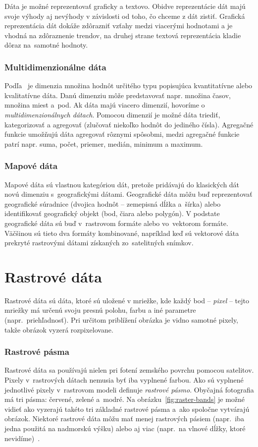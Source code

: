 Dáta je možné reprezentovať graficky a textovo. Obidve reprezentácie dát majú svoje výhody aj nevýhody v závislosti od toho, čo chceme z dát zistiť. Grafická reprezentácia dát dokáže zdôrazniť vzťahy medzi viacerými hodnotami a je vhodná na zdôraznenie trendov, na druhej strane textová reprezentácia kladie dôraz na~samotné hodnoty.

\subsubsection{Multidimenzionálne dáta}
Podľa~\cite{hynek2021webvisual} je dimenzia množina hodnôt určitého typu popisujúca kvantitatívne alebo kvalitatívne dáta. Danú dimenziu môže predstavovať napr. množina časov, množina miest a~pod. Ak dáta majú viacero dimenzií, hovoríme o \emph{multidimenzionálnych dátach}. Pomocou dimenzií je možné dáta triediť, kategorizovať a agregovať (zlučovať niekoľko hodnôt do jediného čísla). Agregačné funkcie umožňujú dáta agregovať rôznymi spôsobmi, medzi agregačné funkcie patrí napr. suma, počet, priemer, medián, minimum a maximum.

\subsubsection{Mapové dáta}
Mapové dáta sú vlastnou kategóriou dát, pretože pridávajú do klasických dát novú dimenziu s~geografickými dátami. Geografické dáta môžu buď reprezentovať geografické súradnice (dvojica hodnôt \--- zemepisná dĺžka a~šírka) alebo identifikovať geografický objekt (bod, čiara alebo polygón). V podstate geografické dáta sú buď v~rastrovom formáte alebo vo~vektorom formáte. Väčšinou sú tieto dva formáty kombinované, napríklad keď sú vektorové dáta prekryté rastrovými dátami získaných zo~satelitných snímkov.

\section{Rastrové dáta}
Rastrové dáta sú dáta, ktoré sú uložené v mriežke, kde každý bod \--- \emph{pixel} \--- tejto mriežky má určenú svoju presnú polohu, farbu a iné parametre (napr.~priehľadnosť). Pri určitom priblížení obrázka je vidno samotné pixely, takže obrázok vyzerá rozpixelovane. 

\subsubsection{Rastrové pásma}
Rastrové dáta sa používajú nielen pri fotení zemského povrchu pomocou satelitov. Pixely v~rastrových dátach nemusia byť iba vyplnené farbou. Ako sú vyplnené jednotlivé pixely v~rastrovom modeli definuje \emph{rastrové pásmo}. Obyčajná fotografia má tri pásma: červené, zelené a~modré. Na obrázku~\ref{fig:raster-bands} je možné vidieť ako vyzerajú takéto tri základné rastrové pásma a~ako spoločne vytvárajú obrázok. Niektoré rastrové dáta môžu mať menej rastrových pásiem (napr.~iba jedna použitá na nadmorskú výšku) alebo aj viac (napr.~na vlnové dĺžky, ktoré nevidíme)~\cite{bolstad2019GIS}.

